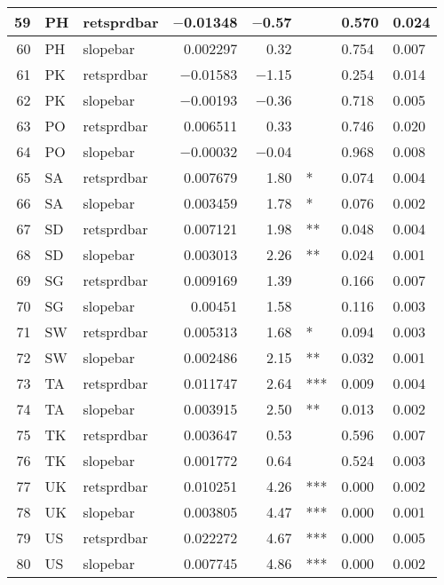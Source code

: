 \begin{longtable}{|r|l|l|r|r|l|l|l|}
   59 &    PH &    retsprdbar &    $-$0.01348 &    $-$0.57 &      &    0.570 &    0.024\\\hline
   60 &    PH &    slopebar &    0.002297 &    0.32 &      &    0.754 &    0.007\\\hline
   61 &    PK &    retsprdbar &    $-$0.01583 &    $-$1.15 &      &    0.254 &    0.014\\\hline
   62 &    PK &    slopebar &    $-$0.00193 &    $-$0.36 &      &    0.718 &    0.005\\\hline
   63 &    PO &    retsprdbar &    0.006511 &    0.33 &      &    0.746 &    0.020\\\hline
   64 &    PO &    slopebar &    $-$0.00032 &    $-$0.04 &      &    0.968 &    0.008\\\hline
   65 &    SA &    retsprdbar &    0.007679 &    1.80 &    * &    0.074 &    0.004\\\hline
   66 &    SA &    slopebar &    0.003459 &    1.78 &    * &    0.076 &    0.002\\\hline
   67 &    SD &    retsprdbar &    0.007121 &    1.98 &    ** &    0.048 &    0.004\\\hline
   68 &    SD &    slopebar &    0.003013 &    2.26 &    ** &    0.024 &    0.001\\\hline
   69 &    SG &    retsprdbar &    0.009169 &    1.39 &      &    0.166 &    0.007\\\hline
   70 &    SG &    slopebar &    0.00451 &    1.58 &      &    0.116 &    0.003\\\hline
   71 &    SW &    retsprdbar &    0.005313 &    1.68 &    * &    0.094 &    0.003\\\hline
   72 &    SW &    slopebar &    0.002486 &    2.15 &    ** &    0.032 &    0.001\\\hline
   73 &    TA &    retsprdbar &    0.011747 &    2.64 &    *** &    0.009 &    0.004\\\hline
   74 &    TA &    slopebar &    0.003915 &    2.50 &    ** &    0.013 &    0.002\\\hline
   75 &    TK &    retsprdbar &    0.003647 &    0.53 &      &    0.596 &    0.007\\\hline
   76 &    TK &    slopebar &    0.001772 &    0.64 &      &    0.524 &    0.003\\\hline
   77 &    UK &    retsprdbar &    0.010251 &    4.26 &    *** &    0.000 &    0.002\\\hline
   78 &    UK &    slopebar &    0.003805 &    4.47 &    *** &    0.000 &    0.001\\\hline
   79 &    US &    retsprdbar &    0.022272 &    4.67 &    *** &    0.000 &    0.005\\\hline
   80 &    US &    slopebar &    0.007745 &    4.86 &    *** &    0.000 &    0.002\\\hline
\end{longtable}

